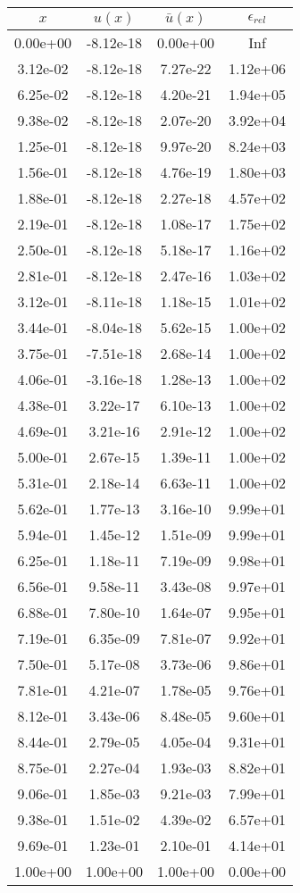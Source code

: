 \begin{tabular}{|c|c|c|c|}
\hline
\textbf{$x$}&\textbf{$u(x)$}&\textbf{$\bar{u}(x)$}&\textbf{$\epsilon_{rel}$}\\\hline
0.00e+00&-8.12e-18&0.00e+00&Inf\\\hline
3.12e-02&-8.12e-18&7.27e-22&1.12e+06\\\hline
6.25e-02&-8.12e-18&4.20e-21&1.94e+05\\\hline
9.38e-02&-8.12e-18&2.07e-20&3.92e+04\\\hline
1.25e-01&-8.12e-18&9.97e-20&8.24e+03\\\hline
1.56e-01&-8.12e-18&4.76e-19&1.80e+03\\\hline
1.88e-01&-8.12e-18&2.27e-18&4.57e+02\\\hline
2.19e-01&-8.12e-18&1.08e-17&1.75e+02\\\hline
2.50e-01&-8.12e-18&5.18e-17&1.16e+02\\\hline
2.81e-01&-8.12e-18&2.47e-16&1.03e+02\\\hline
3.12e-01&-8.11e-18&1.18e-15&1.01e+02\\\hline
3.44e-01&-8.04e-18&5.62e-15&1.00e+02\\\hline
3.75e-01&-7.51e-18&2.68e-14&1.00e+02\\\hline
4.06e-01&-3.16e-18&1.28e-13&1.00e+02\\\hline
4.38e-01&3.22e-17&6.10e-13&1.00e+02\\\hline
4.69e-01&3.21e-16&2.91e-12&1.00e+02\\\hline
5.00e-01&2.67e-15&1.39e-11&1.00e+02\\\hline
5.31e-01&2.18e-14&6.63e-11&1.00e+02\\\hline
5.62e-01&1.77e-13&3.16e-10&9.99e+01\\\hline
5.94e-01&1.45e-12&1.51e-09&9.99e+01\\\hline
6.25e-01&1.18e-11&7.19e-09&9.98e+01\\\hline
6.56e-01&9.58e-11&3.43e-08&9.97e+01\\\hline
6.88e-01&7.80e-10&1.64e-07&9.95e+01\\\hline
7.19e-01&6.35e-09&7.81e-07&9.92e+01\\\hline
7.50e-01&5.17e-08&3.73e-06&9.86e+01\\\hline
7.81e-01&4.21e-07&1.78e-05&9.76e+01\\\hline
8.12e-01&3.43e-06&8.48e-05&9.60e+01\\\hline
8.44e-01&2.79e-05&4.05e-04&9.31e+01\\\hline
8.75e-01&2.27e-04&1.93e-03&8.82e+01\\\hline
9.06e-01&1.85e-03&9.21e-03&7.99e+01\\\hline
9.38e-01&1.51e-02&4.39e-02&6.57e+01\\\hline
9.69e-01&1.23e-01&2.10e-01&4.14e+01\\\hline
1.00e+00&1.00e+00&1.00e+00&0.00e+00\\\hline
\end{tabular}

